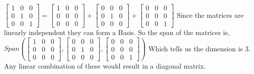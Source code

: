 	$\begin{bmatrix} 
	            1 & 0 & 0 \\
	            0 & 1 & 0 \\
	            0 & 0 & 1
	            \end{bmatrix} = 
	            \begin{bmatrix} 
	            1 & 0 & 0 \\
	            0 & 0 & 0 \\
	            0 & 0 & 0
	            \end{bmatrix}
	            +
	            \begin{bmatrix} 
	            0 & 0 & 0 \\
	            0 & 1 & 0 \\
	            0 & 0 & 0
	            \end{bmatrix}
	            +
	            \begin{bmatrix} 
	            0 & 0 & 0 \\
	            0 & 0 & 0 \\
	            0 & 0 & 1
	            \end{bmatrix}$
	            \newline
	            Since the matrices are linearly independent they can form a Basis. So the span of the matrices is,
	            \newline
	            $Span \left(
	            \begin{bmatrix} 
	            1 & 0 & 0 \\
	            0 & 0 & 0 \\
	            0 & 0 & 0
	            \end{bmatrix},
	            \begin{bmatrix} 
	            0 & 0 & 0 \\
	            0 & 1 & 0 \\
	            0 & 0 & 0
	            \end{bmatrix},
	            \begin{bmatrix} 
	            0 & 0 & 0 \\
	            0 & 0 & 0 \\
	            0 & 0 & 1
	            \end{bmatrix}
	            \right)$
	            Which tells us the dimension is 3. Any linear combination of these would result in a diagonal matrix.